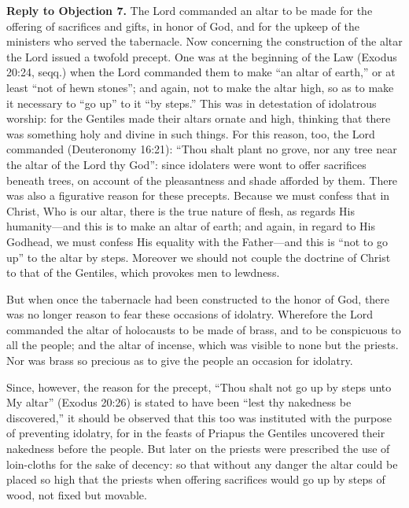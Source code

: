 \textbf{Reply to Objection 7.} The Lord commanded an altar to be made for the offering of sacrifices and gifts, in honor of God, and for the upkeep of the ministers who served the tabernacle. Now concerning the construction of the altar the Lord issued a twofold precept. One was at the beginning of the Law (Exodus 20:24, seqq.) when the Lord commanded them to make ``an altar of earth,'' or at least ``not of hewn stones''; and again, not to make the altar high, so as to make it necessary to ``go up'' to it ``by steps.'' This was in detestation of idolatrous worship: for the Gentiles made their altars ornate and high, thinking that there was something holy and divine in such things. For this reason, too, the Lord commanded (Deuteronomy 16:21): ``Thou shalt plant no grove, nor any tree near the altar of the Lord thy God'': since idolaters were wont to offer sacrifices beneath trees, on account of the pleasantness and shade afforded by them. There was also a figurative reason for these precepts. Because we must confess that in Christ, Who is our altar, there is the true nature of flesh, as regards His humanity—and this is to make an altar of earth; and again, in regard to His Godhead, we must confess His equality with the Father—and this is ``not to go up'' to the altar by steps. Moreover we should not couple the doctrine of Christ to that of the Gentiles, which provokes men to lewdness.

But when once the tabernacle had been constructed to the honor of God, there was no longer reason to fear these occasions of idolatry. Wherefore the Lord commanded the altar of holocausts to be made of brass, and to be conspicuous to all the people; and the altar of incense, which was visible to none but the priests. Nor was brass so precious as to give the people an occasion for idolatry.

Since, however, the reason for the precept, ``Thou shalt not go up by steps unto My altar'' (Exodus 20:26) is stated to have been ``lest thy nakedness be discovered,'' it should be observed that this too was instituted with the purpose of preventing idolatry, for in the feasts of Priapus the Gentiles uncovered their nakedness before the people. But later on the priests were prescribed the use of loin-cloths for the sake of decency: so that without any danger the altar could be placed so high that the priests when offering sacrifices would go up by steps of wood, not fixed but movable.

